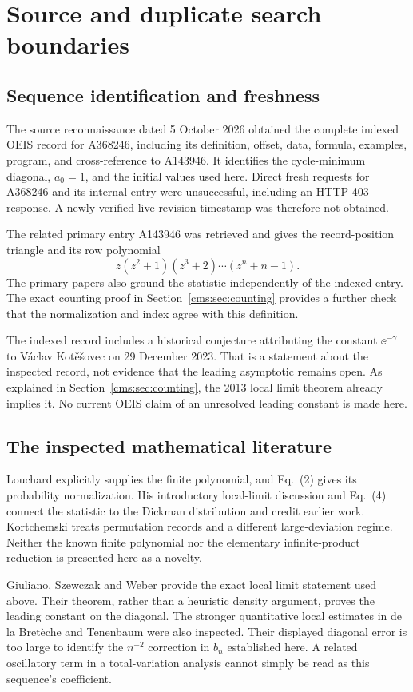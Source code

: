 \section{Source and duplicate search boundaries}\label{cms:sec:sources}
\subsection{Sequence identification and freshness}
The source reconnaissance dated 5 October 2026 obtained the complete indexed OEIS record for A368246, including its definition, offset, data, formula, examples, program, and cross-reference to A143946. It identifies the cycle-minimum diagonal, $a_0=1$, and the initial values used here. Direct fresh requests for A368246 and its internal entry were unsuccessful, including an HTTP 403 response. A newly verified live revision timestamp was therefore not obtained.

The related primary entry A143946 was retrieved and gives the record-position triangle and its row polynomial
\[
z(z^2+1)(z^3+2)\cdots(z^n+n-1).
\]
The primary papers also ground the statistic independently of the indexed entry. The exact counting proof in Section~\ref{cms:sec:counting} provides a further check that the normalization and index agree with this definition.

The indexed record includes a historical conjecture attributing the constant $\ee^{-\gamma}$ to V\'aclav Kot\v e\v sovec on 29 December 2023. That is a statement about the inspected record, not evidence that the leading asymptotic remains open. As explained in Section~\ref{cms:sec:counting}, the 2013 local limit theorem already implies it. No current OEIS claim of an unresolved leading constant is made here.

\subsection{The inspected mathematical literature}
Louchard \cite[Eq.~(1)]{Louchard} explicitly supplies the finite polynomial, and Eq.~(2) gives its probability normalization. His introductory local-limit discussion and Eq.~(4) connect the statistic to the Dickman distribution and credit earlier work. Kortchemski \cite{Kortchemski} treats permutation records and a different large-deviation regime. Neither the known finite polynomial nor the elementary infinite-product reduction is presented here as a novelty.

Giuliano, Szewczak and Weber \cite[Theorem~2.1]{GSW} provide the exact local limit statement used above. Their theorem, rather than a heuristic density argument, proves the leading constant on the diagonal. The stronger quantitative local estimates in de la Bret\`eche and Tenenbaum \cite[Eqs.~(2.14), (3.1)]{BT} were also inspected. Their displayed diagonal error is too large to identify the $n^{-2}$ correction in $b_n$ established here. A related oscillatory term in a total-variation analysis cannot simply be read as this sequence's coefficient.

